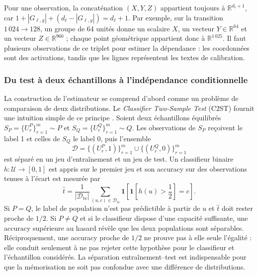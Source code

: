 Pour une observation, la concaténation $(X,Y,Z)$ appartient toujours à
$\mathbb{R}^{d_{\ell}+1}$, car
$1+|G_{\ell,g}|+(d_{\ell}-|G_{\ell,g}|)=d_{\ell}+1$. Par exemple, sur la
transition $1\,024\rightarrow128$, un groupe de 64 unités donne un scalaire
$X$, un vecteur $Y\in\mathbb{R}^{64}$ et un vecteur
$Z\in\mathbb{R}^{960}$ ; chaque point géométrique appartient donc à
$\mathbb{R}^{1\,025}$. Il faut plusieurs observations de ce triplet pour estimer
la dépendance : les coordonnées sont des activations, tandis que les lignes
représentent les textes de calibration.

\subsubsection{Du test à deux échantillons à l'indépendance conditionnelle}

La construction de l'estimateur se comprend d'abord comme un problème de
comparaison de deux distributions. Le \emph{Classifier Two-Sample Test}
(C2ST) fournit une intuition simple de ce principe
\cite{lopezpaz2017c2st}. Soient deux échantillons équilibrés
$S_P=\{U_r^P\}_{r=1}^{m}\sim P$ et
$S_Q=\{U_r^Q\}_{r=1}^{m}\sim Q$. Les observations de $S_P$ reçoivent le
label 1 et celles de $S_Q$ le label 0, puis l'ensemble
\begin{equation}
    \mathcal{D}
    =\{(U_r^P,1)\}_{r=1}^{m}
     \cup\{(U_r^Q,0)\}_{r=1}^{m}
\end{equation}
est séparé en un jeu d'entraînement et un jeu de test. Un classifieur binaire
$h:\mathcal{U}\rightarrow[0,1]$ est appris sur le premier jeu et son accuracy
sur des observations tenues à l'écart est mesurée par
\begin{equation}
    \widehat{t}
    =\frac{1}{|\mathcal{D}_{\mathrm{te}}|}
      \sum_{(u,c)\in\mathcal{D}_{\mathrm{te}}}
      \mathbf{1}\!\left[
        \mathbf{1}\!\left[h(u)>\frac{1}{2}\right]=c
      \right].
    \label{eq:c2st_accuracy}
\end{equation}
Si $P=Q$, le label de population n'est pas prédictible à partir de $u$ et
$\widehat{t}$ doit rester proche de $1/2$. Si $P\neq Q$ et si le classifieur
dispose d'une capacité suffisante, une accuracy supérieure au hasard révèle
que les deux populations sont séparables. Réciproquement, une accuracy proche
de $1/2$ ne prouve pas à elle seule l'égalité : elle conduit seulement à ne pas
rejeter cette hypothèse pour le classifieur et l'échantillon considérés. La
séparation entraînement--test est indispensable pour que la mémorisation ne
soit pas confondue avec une différence de distributions.

